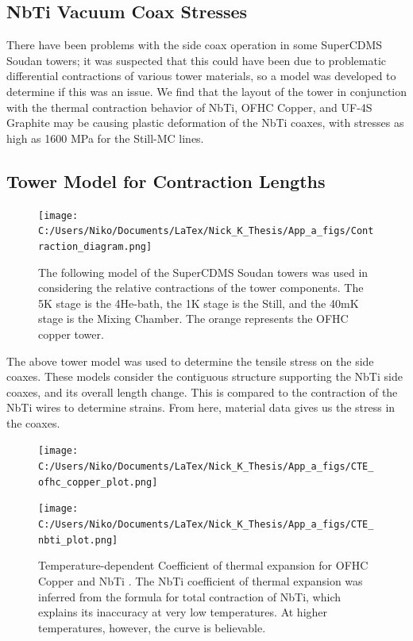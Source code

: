 \documentclass{report}
\begin{document}
\newpage

\begin{appendices}

\chapter{NbTi Vacuum Coax Stresses}

There have been problems with the side coax operation in some SuperCDMS Soudan towers; it was suspected that this could have been due to problematic differential contractions of various tower materials, so a model was developed to determine if this was an issue. We find that the layout of the tower in conjunction with the thermal contraction behavior of NbTi, OFHC Copper, and UF-4S Graphite may be causing plastic deformation of the NbTi coaxes, with stresses as high as 1600 MPa for the Still-MC lines.

\section{Tower Model for Contraction Lengths}

\begin{figure}[h]
\texttt{[image: C:/Users/Niko/Documents/LaTex/Nick\_K\_Thesis/App\_a\_figs/Contraction\_diagram.png]}
\caption{The following model of the SuperCDMS Soudan towers was used in considering the relative contractions of the tower components. The 5K stage is the 4He-bath, the 1K stage is the Still, and the 40mK stage is the Mixing Chamber. The orange represents the OFHC copper tower.}
\end{figure}

The above tower model was used to determine the tensile stress on the side coaxes. These models consider the contiguous structure supporting the NbTi side coaxes, and its overall length change. This is compared to the contraction of the NbTi wires to determine strains. From here, material data gives us the stress in the coaxes.

\begin{figure}[h]
\centering
\begin{minipage}{.4\textwidth}
\texttt{[image: C:/Users/Niko/Documents/LaTex/Nick\_K\_Thesis/App\_a\_figs/CTE\_ofhc\_copper\_plot.png]}
\end{minipage}
\begin{minipage}{.4\textwidth}
\texttt{[image: C:/Users/Niko/Documents/LaTex/Nick\_K\_Thesis/App\_a\_figs/CTE\_nbti\_plot.png]}
\end{minipage}
\caption{Temperature-dependent Coefficient of thermal expansion for OFHC Copper \cite{ofhc_copper} and NbTi \cite{Marquardt2000}. The NbTi coefficient of thermal expansion was inferred from the formula for total contraction of NbTi, which explains its inaccuracy at very low temperatures. At higher temperatures, however, the curve is believable.}
\end{figure}


\end{appendices}
\end{document}
